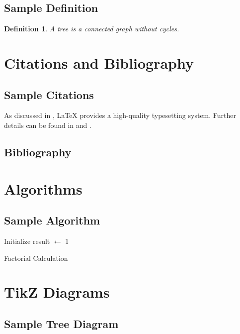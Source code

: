 \documentclass[12pt,a4paper]{report}
\newtheorem{definition}{Definition}[section]
\begin{document}
\section{Sample Definition}
\begin{definition}
A tree is a connected graph without cycles.
\end{definition}

\chapter{Citations and Bibliography}
\section{Sample Citations}
\justify
As discussed in \cite{latexcompanion}, LaTeX provides a high-quality typesetting system. Further details can be found in \cite{knuth1984texbook} and \cite{lamport1994latex}.

\section{Bibliography}



\chapter{Algorithms}
\section{Sample Algorithm}
\begin{algorithm}[H]
\SetAlgoLined
{}
Initialize result $\gets$ 1\;
\caption{Factorial Calculation}
\end{algorithm}

\chapter{TikZ Diagrams}
\section{Sample Tree Diagram}
\begin{center}
\end{center}
\end{document}

